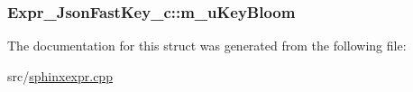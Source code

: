 \hypertarget{structExpr__JsonFastKey__c_a01f5dd35d395e83523a405adf9060f08}{
\subsubsection[{m\-\_\-u\-Key\-Bloom}]{ Expr\-\_\-\-Json\-Fast\-Key\-\_\-c\-::m\-\_\-u\-Key\-Bloom\hspace{0.3cm}{\ttfamily [protected]}}}\label{structExpr__JsonFastKey__c_a01f5dd35d395e83523a405adf9060f08}


The documentation for this struct was generated from the following file\-:\begin{DoxyCompactItemize}
\item 
src/\hyperlink{sphinxexpr_8cpp}{sphinxexpr.\-cpp}\end{DoxyCompactItemize}

